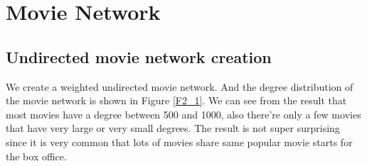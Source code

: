 \documentclass[11pt]{article}
\begin{document}
\begin{table}[h]
\center
\caption{The same information table for previous actor/actress}
\label{table_1_4}
\end{table}

\section{Movie Network}

\subsection{Undirected movie network creation}
We create a weighted undirected movie network. And the degree distribution of the movie network is shown in Figure \ref{F2_1}. We can see from the result that most movies have a degree between 500 and 1000, also there're only a few movies that have very large or very small degrees. The result is not super surprising since it is very common that lots of movies share same popular movie starts for the box office.
\end{document}
